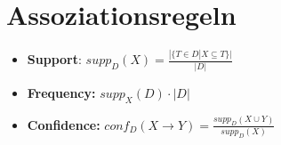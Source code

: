 \documentclass[14pt]{article}
\begin{document}
\section{Assoziationsregeln}
\begin{itemize}
    \item \textbf{Support}: $supp_D(X) = \frac{|\{ T \in D |X \subseteq T\}|}{|D|}$
    \item \textbf{Frequency:} $supp_X(D) \cdot |D|$
    \item \textbf{Confidence:} $conf_D(X \rightarrow Y) = \frac{supp_D(X \cup Y)}{supp_D(X)}$
\end{itemize}
\end{document}
